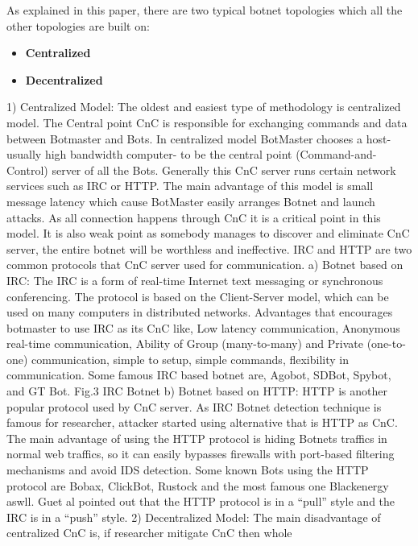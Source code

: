 As explained in this paper, there are two typical botnet topologies which all the other topologies are built on:
\begin{itemize}
\item \textbf{Centralized}
\item \textbf{Decentralized}
\end{itemize}
1) Centralized Model: The oldest and easiest type of
methodology is centralized model. The Central point CnC is
responsible for exchanging commands and data between
Botmaster and Bots. In centralized model BotMaster chooses
a host-usually high bandwidth computer- to be the central
point (Command-and-Control) server of all the Bots.
Generally this CnC server runs certain network services such
as IRC or HTTP. The main advantage of this model is small
message latency which cause BotMaster easily arranges
Botnet and launch attacks. As all connection happens through
CnC it is a critical point in this model. It is also weak point
as somebody manages to discover and eliminate CnC server,
the entire botnet will be worthless and ineffective. IRC and
HTTP are two common protocols that CnC server used for
communication.
	a) Botnet based on IRC: The IRC is a form of real-time
Internet text messaging or synchronous conferencing. The
protocol is based on the Client-Server model, which can be
used on many computers in distributed networks. Advantages
that encourages botmaster to use IRC as its CnC like, Low
latency communication, Anonymous real-time
communication, Ability of Group (many-to-many) and
Private (one-to-one) communication, simple to setup, simple
commands, flexibility in communication. Some famous IRC
based botnet are, Agobot, SDBot, Spybot, and GT Bot.
Fig.3 IRC Botnet
	b) Botnet based on HTTP: HTTP is another popular protocol
used by CnC server. As IRC Botnet detection technique is
famous for researcher, attacker started using alternative that
is HTTP as CnC. The main advantage of using the HTTP
protocol is hiding Botnets traffics in normal web traffics, so it
can easily bypasses firewalls with port-based filtering
mechanisms and avoid IDS detection. Some known Bots
using the HTTP protocol are Bobax, ClickBot, Rustock and
the most famous one Blackenergy aswll. Guet al pointed out
that the HTTP protocol is in a “pull” style and the IRC is in a
“push” style.
2) Decentralized Model: The main disadvantage of
centralized CnC is, if researcher mitigate CnC then whole

